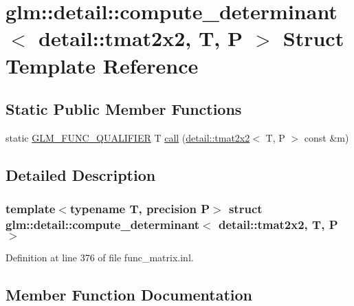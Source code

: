 \hypertarget{structglm_1_1detail_1_1compute__determinant_3_01detail_1_1tmat2x2_00_01_t_00_01_p_01_4}{}\section{glm\+:\+:detail\+:\+:compute\+\_\+determinant$<$ detail\+:\+:tmat2x2, T, P $>$ Struct Template Reference}
\label{structglm_1_1detail_1_1compute__determinant_3_01detail_1_1tmat2x2_00_01_t_00_01_p_01_4}
\subsection*{Static Public Member Functions}
\begin{DoxyCompactItemize}
\item 
static \hyperlink{setup_8hpp_a33fdea6f91c5f834105f7415e2a64407}{G\+L\+M\+\_\+\+F\+U\+N\+C\+\_\+\+Q\+U\+A\+L\+I\+F\+I\+ER} T \hyperlink{structglm_1_1detail_1_1compute__determinant_3_01detail_1_1tmat2x2_00_01_t_00_01_p_01_4_a58a62a3968a9af7acd4522972236742e}{call} (\hyperlink{structglm_1_1detail_1_1tmat2x2}{detail\+::tmat2x2}$<$ T, P $>$ const \&m)
\end{DoxyCompactItemize}


\subsection{Detailed Description}
\subsubsection*{template$<$typename T, precision P$>$\newline
struct glm\+::detail\+::compute\+\_\+determinant$<$ detail\+::tmat2x2, T, P $>$}



Definition at line 376 of file func\+\_\+matrix.\+inl.



\subsection{Member Function Documentation}
\mbox{\label{structglm_1_1detail_1_1compute__determinant_3_01detail_1_1tmat2x2_00_01_t_00_01_p_01_4_a58a62a3968a9af7acd4522972236742e}} 
